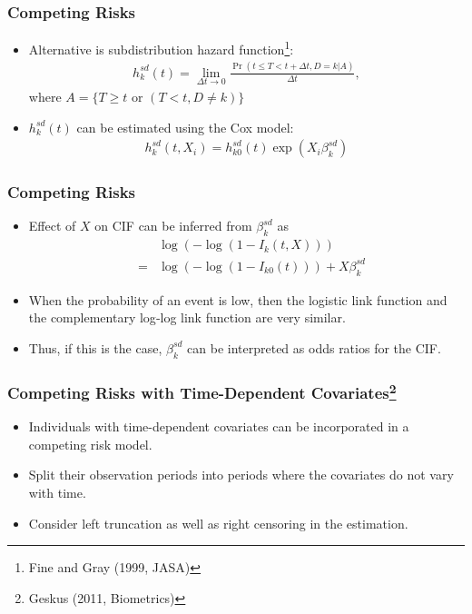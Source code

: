 \documentclass[aspectratio=169, 12pt]{beamer}
\begin{document}
	\begin{frame}
	\frametitle{Competing Risks}
	\begin{itemize}
	\item Alternative is subdistribution hazard function\footnote{Fine and Gray (1999, JASA)}:
	\begin{eqnarray*}
	h_k^{sd} (t) = \lim_{\Delta t \to 0}\frac{\Pr(t \leq T < t + \Delta t, D = k | A)}{\Delta t},
	\end{eqnarray*}
	where $A = \{T \geq t \text{ or } (T < t, D \neq k)\}$
	\item $h_k^{sd} (t)$ can be estimated using the Cox model:
	\begin{eqnarray*}
	h_k^{sd} (t, X_i) = h_{k0}^{sd} (t) \exp(X_i \beta_k^{sd})
	\end{eqnarray*}

	\end{itemize}

	\end{frame}

	\begin{frame}
	\frametitle{Competing Risks}
	\begin{itemize}
	\item Effect of $X$ on CIF can be inferred from $\beta_k^{sd}$ as
	\begin{eqnarray*}
	&\phantom{=}& \log(-\log(1 - I_k(t,X)))\\
	&=& \log(-\log(1 - I_{k0}(t))) + X \beta_k^{sd}
	\end{eqnarray*}
	\item When the probability of an event is low, then the logistic link function and the complementary log‐log link function are very similar.
	\item Thus, if this is the case, $\beta_k^{sd}$ can be interpreted as odds ratios for the CIF.

	\end{itemize}

	\end{frame}

	\begin{frame}
	\frametitle{Competing Risks with Time-Dependent Covariates\footnote{Geskus (2011, Biometrics)}}
	\begin{itemize}
	\item Individuals with time-dependent covariates can be incorporated in a competing risk model.
	\item Split their observation periods into periods where the covariates do not vary with time.
	\item Consider left truncation as well as right censoring in the estimation.

	\end{itemize}

	\end{frame}
\end{document}
